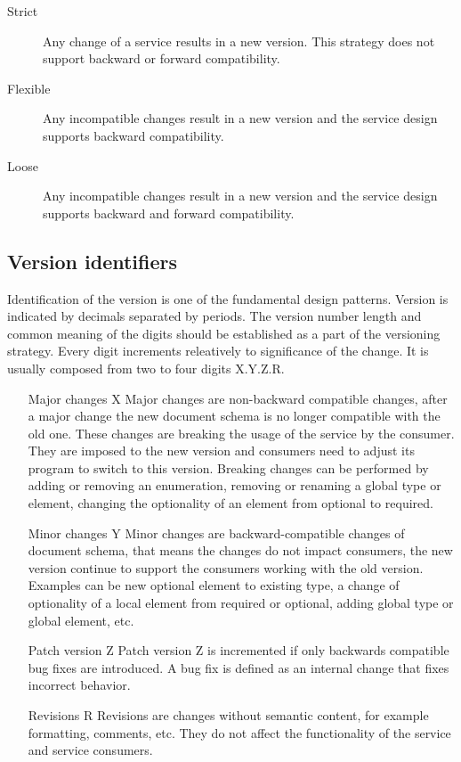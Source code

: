 \begin{description}
  \item[Strict] 
  Any change of a service results in a new version. This strategy does not support backward or forward compatibility.
  \item[Flexible]
  Any incompatible changes result in a new version and the service design supports backward compatibility.
  \item[Loose]
  Any incompatible changes result in a new version and the service design supports backward and forward compatibility.
\end{description}

\subsection{Version identifiers}
Identification of the version is one of the fundamental design patterns. Version is indicated by decimals separated by periods. The version number length and common meaning of the digits should be established as a part of the versioning strategy. Every digit increments releatively to significance of the change. It is usually composed from two to four digits X.Y.Z.R.

\begin{enumerate}
  \item[Major changes X]
  Major changes are non-backward compatible changes, after a major change the new document schema is no longer compatible with the old one. These changes are breaking the usage of the service by the consumer. They are imposed to the new version and consumers need to adjust its program to switch to this version. Breaking changes can be performed by adding or removing an enumeration, removing or renaming a global type or element, changing the optionality of an element from optional to required.
    \item[Minor changes Y]
  Minor changes are backward-compatible changes of document schema, that means the changes do not impact consumers, the new version continue to support the consumers working with the old version. Examples can be new optional element to existing type, a change of optionality of a local element from required or optional, adding global type or global element, etc.
  \item[Patch version Z]
  Patch version Z is incremented if only backwards compatible bug fixes are introduced. A bug fix is defined as an internal change that fixes incorrect behavior.
  \item[Revisions R]
  Revisions are changes without semantic content, for example formatting, comments, etc. They do not affect the functionality of the service and service consumers.
\end{enumerate} 


